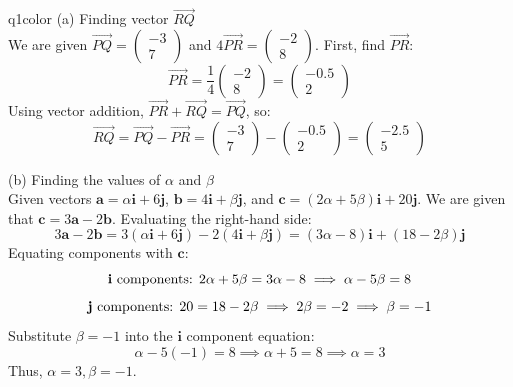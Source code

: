 \documentclass[11pt,a4paper]{article}
\begin{document}
\begin{ansbox}{q1color}
(a) Finding vector $\overrightarrow{RQ}$\\[4pt]
We are given $\overrightarrow{PQ} = \begin{pmatrix} -3 \\ 7 \end{pmatrix}$ and $4\overrightarrow{PR} = \begin{pmatrix} -2 \\ 8 \end{pmatrix}$. First, find $\overrightarrow{PR}$:
\[
\overrightarrow{PR} = \frac{1}{4}\begin{pmatrix} -2 \\ 8 \end{pmatrix} = \begin{pmatrix} -0.5 \\ 2 \end{pmatrix}
\]
Using vector addition, $\overrightarrow{PR} + \overrightarrow{RQ} = \overrightarrow{PQ}$, so:
\[
\overrightarrow{RQ} = \overrightarrow{PQ} - \overrightarrow{PR} = \begin{pmatrix} -3 \\ 7 \end{pmatrix} - \begin{pmatrix} -0.5 \\ 2 \end{pmatrix} = \boxed{\begin{pmatrix} -2.5 \\ 5 \end{pmatrix}}
\]

(b) Finding the values of $\alpha$ and $\beta$\\[4pt]
Given vectors $\mathbf{a} = \alpha\mathbf{i} + 6\mathbf{j}$, $\mathbf{b} = 4\mathbf{i} + \beta\mathbf{j}$, and $\mathbf{c} = (2\alpha + 5\beta)\mathbf{i} + 20\mathbf{j}$. We are given that $\mathbf{c} = 3\mathbf{a} - 2\mathbf{b}$. Evaluating the right-hand side:
\[
3\mathbf{a} - 2\mathbf{b} = 3(\alpha\mathbf{i} + 6\mathbf{j}) - 2(4\mathbf{i} + \beta\mathbf{j}) = (3\alpha - 8)\mathbf{i} + (18 - 2\beta)\mathbf{j}
\]
Equating components with $\mathbf{c}$:
\[
\text{\textbf{i} components: } 2\alpha + 5\beta = 3\alpha - 8 \implies \alpha - 5\beta = 8
\]
\[
\text{\textbf{j} components: } 20 = 18 - 2\beta \implies 2\beta = -2 \implies \beta = -1
\]
Substitute $\beta = -1$ into the $\mathbf{i}$ component equation:
\[
\alpha - 5(-1) = 8 \implies \alpha + 5 = 8 \implies \alpha = 3
\]
Thus, $\boxed{\alpha = 3, \beta = -1}$.
\end{ansbox}
\end{document}
